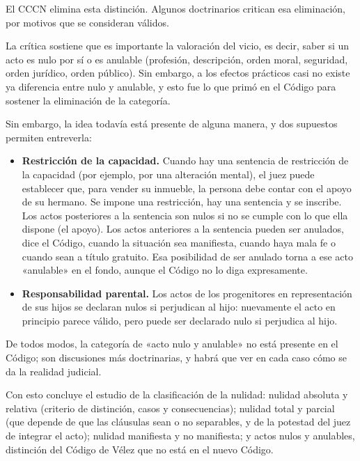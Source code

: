 \documentclass[12pt,oneside]{book}
\begin{document}
El CCCN elimina esta distinción. Algunos doctrinarios critican esa eliminación, por motivos que se consideran válidos.

La crítica sostiene que es importante la valoración del vicio, es decir, saber si un acto es nulo por sí o es anulable (profesión, descripción, orden moral, seguridad, orden jurídico, orden público). Sin embargo, a los efectos prácticos casi no existe ya diferencia entre nulo y anulable, y esto fue lo que primó en el Código para sostener la eliminación de la categoría.

Sin embargo, la idea todavía está presente de alguna manera, y dos supuestos permiten entreverla:

\begin{itemize}
    \item \textbf{Restricción de la capacidad.} Cuando hay una sentencia de restricción de la capacidad (por ejemplo, por una alteración mental), el juez puede establecer que, para vender su inmueble, la persona debe contar con el apoyo de su hermano. Se impone una restricción, hay una sentencia y se inscribe. Los actos posteriores a la sentencia son nulos si no se cumple con lo que ella dispone (el apoyo). Los actos anteriores a la sentencia pueden ser anulados, dice el Código, cuando la situación sea manifiesta, cuando haya mala fe o cuando sean a título gratuito. Esa posibilidad de ser anulado torna a ese acto «anulable» en el fondo, aunque el Código no lo diga expresamente.
    \item \textbf{Responsabilidad parental.} Los actos de los progenitores en representación de sus hijos se declaran nulos si perjudican al hijo: nuevamente el acto en principio parece válido, pero puede ser declarado nulo si perjudica al hijo.
\end{itemize}

De todos modos, la categoría de «acto nulo y anulable» no está presente en el Código; son discusiones más doctrinarias, y habrá que ver en cada caso cómo se da la realidad judicial.

Con esto concluye el estudio de la clasificación de la nulidad: nulidad absoluta y relativa (criterio de distinción, casos y consecuencias); nulidad total y parcial (que depende de que las cláusulas sean o no separables, y de la potestad del juez de integrar el acto); nulidad manifiesta y no manifiesta; y actos nulos y anulables, distinción del Código de Vélez que no está en el nuevo Código.
\end{document}
